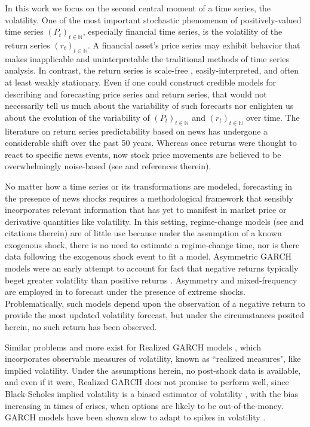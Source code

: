 \documentclass[11pt,3p,review,authoryear]{elsarticle}
\theoremstyle{definition}
\begin{document}
In this work we focus on the second central moment of a time series, the volatility.  One of the most important stochastic phenomenon of positively-valued time series $(P_{t})_{t\in\mathbb{N}}$, especially financial time series, is the volatility of the return series $(r_{t})_{t\in\mathbb{N}}$.  A financial asset's price series may exhibit behavior that makes inapplicable and uninterpretable the traditional methods of time series analysis.  In contrast, the return series is scale-free \citep{tsay2005analysis}, easily-interpreted, and often at least weakly stationary.  Even if one could construct credible models for describing and forecasting price series and return series, that would not necessarily tell us much about the variability of such forecasts nor enlighten us about the evolution of the variability of $(P_{t})_{t\in\mathbb{N}}$ and $(r_{t})_{t\in\mathbb{N}}$ over time.  The literature on return series predictability based on news has undergone a considerable shift over the past 50 years.  Whereas once returns were thought to react to specific news events, now stock price movements are believed to be overwhelmingly noise-based (see \citet{boudoukh2019information} and references therein).

No matter how a time series or its transformations are modeled, forecasting in the presence of news shocks requires a methodological framework that sensibly incorporates relevant information that has yet to manifest in market price or derivative quantities like volatility.  In this setting, regime-change models (see \citet{bauwens2006regime} and citations therein) are of little use because under the assumption of a known exogenous shock, there is no need to estimate a regime-change time, nor is there data following the exogenous shock event to fit a model.  Asymmetric GARCH models were an early attempt to account for fact that negative returns typically beget greater volatility than positive returns \citep{hansen2012realized}.  Asymmetry and mixed-frequency are employed in \cite{wang2020forecasting} to forecast under the presence of extreme shocks.  Problematically, such models depend upon the observation of a negative return to provide the most updated volatility forecast, but under the circumstances posited herein, no such return has been observed.

Similar problems and more exist for Realized GARCH models \citep{hansen2012realized}, which incorporates observable measures of volatility, known as  ``realized measures", like implied volatility.  Under the assumptions herein, no post-shock data is available, and even if it were, Realized GARCH does not promise to perform well, since Black-Scholes implied volatility is a biased estimator of volatility \citep{mayhew1995implied, christensen1998relation}, with the bias increasing in times of crises, when options are likely to be out-of-the-money.  GARCH models have been shown slow to adapt to spikes in volatility \citep{andersen2003modeling}.
\end{document}
